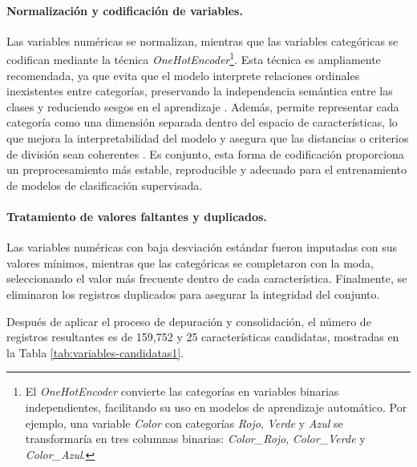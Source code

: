 \documentclass[a4paper,fleqn]{cas-sc}
\begin{document}
\paragraph{\textbf{Normalización y codificación de variables.}}

	Las variables numéricas se normalizan, mientras que las variables categóricas se codifican mediante la técnica  \textit{OneHotEncoder}\footnote{El \textit{OneHotEncoder} convierte las categorías en variables binarias independientes, facilitando su uso en modelos de aprendizaje automático. Por ejemplo, una variable \textit{Color} con categorías \textit{Rojo}, \textit{Verde} y \textit{Azul} se transformaría en tres columnas binarias: \textit{Color\_Rojo}, \textit{Color\_Verde} y \textit{Color\_Azul}.}.
	Esta técnica es ampliamente recomendada, ya que evita que el modelo interprete relaciones ordinales inexistentes entre categorías, preservando la independencia semántica entre las clases y reduciendo sesgos en el aprendizaje \cite{geron2019hands}. Además,  permite representar cada categoría como una dimensión separada dentro del espacio de características, lo que mejora la interpretabilidad del modelo y asegura que las distancias o criterios de división sean coherentes \cite{raschka2020python}. Es conjunto, esta forma de codificación proporciona un preprocesamiento más estable, reproducible y adecuado para el entrenamiento de modelos de clasificación supervisada.

\paragraph{\textbf{Tratamiento de valores faltantes y duplicados.}}

Las variables numéricas con baja desviación estándar fueron imputadas con sus valores mínimos, mientras que las categóricas se completaron con la moda, seleccionando el valor más frecuente dentro de cada característica.  
Finalmente, se eliminaron los registros duplicados para asegurar la integridad del conjunto.



\par\vspace{1em}\noindent Después de aplicar el proceso de depuración y consolidación, el número de registros resultantes es de 
159,752 y  25 características candidatas, mostradas en la Tabla \ref{tab:variables-candidatas1}.


\end{document}
